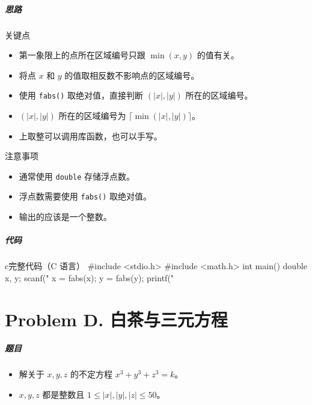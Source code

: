 \documentclass[
     aspectratio=169,                   %
]{beamer}
\begin{document}
\begin{frame}
	\frametitle{思路}
	 \begin{exampleblock}{关键点}
	 	\begin{itemize}
			\item 第一象限上的点所在区域编号只跟 $\min(x,y)$ 的值有关。
			\item 将点 $x$ 和 $y$ 的值取相反数不影响点的区域编号。
		\end{itemize}
	\end{exampleblock}
	\begin{itemize}
		\item 使用 \lstinline|fabs()| 取绝对值，直接判断 $(|x|,|y|)$ 所在的区域编号。
		\item $(|x|,|y|)$ 所在的区域编号为 $\lceil\min(|x|,|y|)\rceil$。
		\item 上取整可以调用库函数，也可以手写。
	\end{itemize}
	\begin{alertblock}{注意事项}
		\begin{itemize}
			\item 通常使用 \lstinline|double| 存储浮点数。
			\item 浮点数需要使用 \lstinline|fabs()| 取绝对值。
			\item 输出的应该是一个整数。
		\end{itemize}
	\end{alertblock}
\end{frame}

\begin{frame}[fragile]
	\frametitle{代码}
	\begin{codeblock}{c}{完整代码（C 语言）}
#include <stdio.h>
#include <math.h>
int main() {
    double x, y;
    scanf("%
    x = fabs(x);
    y = fabs(y);
    printf("%
}
\end{codeblock}
\end{frame}


\part{Problem D. 白茶与三元方程}
\begin{frame}
	\frametitle{题目}
	\begin{itemize}
		\item 解关于 $x,y,z$ 的不定方程 $x^3+y^3+z^3=k$。
		\item $x,y,z$ 都是整数且 $1 \leq |x|,|y|,|z| \leq 50$。
	\end{itemize}
\end{frame}
\end{document}
